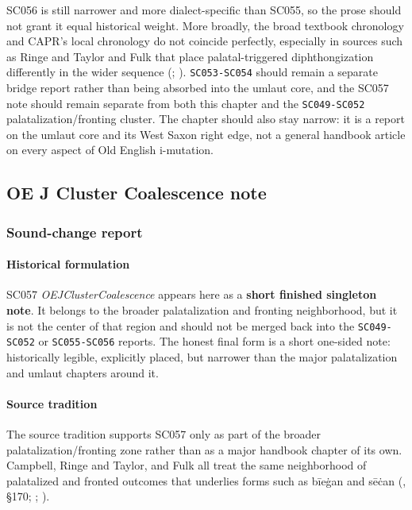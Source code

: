 \documentclass[
  british,
  a4paper,
]{article}
\begin{document}
SC056 is still narrower and more dialect-specific than SC055, so the
prose should not grant it equal historical weight. More broadly, the
broad textbook chronology and CAPR's local chronology do not coincide
perfectly, especially in sources such as Ringe and Taylor and Fulk that
place palatal-triggered diphthongization differently in the wider
sequence (; ). \texttt{SC053-SC054} should remain a separate bridge report
rather than being absorbed into the umlaut core, and the SC057 note
should remain separate from both this chapter and the
\texttt{SC049-SC052} palatalization/fronting cluster. The chapter should
also stay narrow: it is a report on the umlaut core and its West Saxon
right edge, not a general handbook article on every aspect of Old
English i-mutation.

\subsection{OE J Cluster Coalescence
note}\label{oe-j-cluster-coalescence-note}

\subsubsection{Sound-change report}\label{sound-change-report-35}

\paragraph{Historical formulation}\label{historical-formulation-35}

SC057 \emph{OEJClusterCoalescence} appears here as a \textbf{short
finished singleton note}. It belongs to the broader palatalization and
fronting neighborhood, but it is not the center of that region and
should not be merged back into the \texttt{SC049-SC052} or
\texttt{SC055-SC056} reports. The honest final form is a short one-sided
note: historically legible, explicitly placed, but narrower than the
major palatalization and umlaut chapters around it.

\paragraph{Source tradition}\label{source-tradition-35}

The source tradition supports SC057 only as part of the broader
palatalization/fronting zone rather than as a major handbook chapter of
its own. Campbell, Ringe and Taylor, and Fulk all treat the same
neighborhood of palatalized and fronted outcomes that underlies forms
such as bīeġan and sēċan (, §170; ; ).
\end{document}
